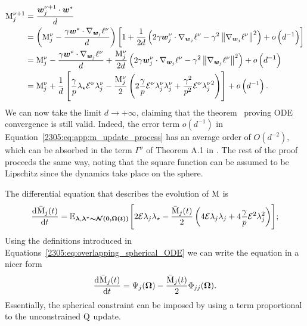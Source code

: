 \begin{equation}\label{2305:eq:app:m_update_process}
\begin{split}
  \mathrm{M}^{\nu+1}_{j} &= \frac{{\boldsymbol{w}}^{\nu+1}_j\cdot{\boldsymbol{w}}^*}{d} \\
    &= \left(\mathrm{M}^{\nu}_{j} - \frac{\gamma{\boldsymbol{w}}^*\cdot\nabla_{{\boldsymbol{w}}_j}{\ell^\nu}}{d}\right)\left[1+ \frac{1}{2d}\left(2\gamma{\boldsymbol{w}}^{\nu}_j\cdot \nabla_{{\boldsymbol{w}}_j}{\ell^\nu}-\gamma^2\left\|\nabla_{{\boldsymbol{w}}_j}{\ell^\nu}\right\|^2\right)+o\left(d^{-1}\right)\right]\\
    &= \mathrm{M}^{\nu}_{j} - \frac{\gamma{\boldsymbol{w}}^*\cdot\nabla_{{\boldsymbol{w}}_j}{\ell^\nu}}{d} + \frac{\mathrm{M}^{\nu}_{j}}{2d}\left(2\gamma{\boldsymbol{w}}^{\nu}_j\cdot \nabla_{{\boldsymbol{w}}_j}{\ell^\nu}-\gamma^2\left\|\nabla_{{\boldsymbol{w}}_j}{\ell^\nu}\right\|^2\right)+o\left(d^{-1}\right) \\
    &= \mathrm{M}^{\nu}_{j} +\frac{1}{d}\left[
      \frac{\gamma}{p} \lambda_\star\mathcal{E}^\nu\lambda^\nu_j -
      \frac{\mathrm{M}^{\nu}_{j}}{2}\left(2\frac{\gamma}{p}\mathcal{E}^\nu\lambda^\nu_j\lambda^\nu_j + \frac{\gamma^2}{p^2} {\mathcal{E}^\nu\lambda^\nu_j}^2\right)
    \right] + o\left(d^{-1}\right).
\end{split}
\end{equation}
We can now take the limit \(d\to+\infty\), claiming that the theorem~\cite{veiga2022phase,goldt2019dynamics} proving ODE convergence is still valid. Indeed, the error term $o(d^{-1})$ in Equation~\eqref{2305:eq:app:m_update_process} has an average order of $O(d^{-2})$, which can be absorbed in the term $\Gamma^\nu$ of Theorem A.1 in \cite{veiga2022phase}. The rest of the proof proceeds the same way, noting that the square function can be assumed to be Lipschitz since the dynamics take place on the sphere.

The differential equation that describes the evolution of \(\mathrm{M}\) is
\[
  \dod{\bar\M_j{\left(t\right)}}{t} =\mathbb E_{\vec{\lf},\vec{\lf^* \sim \gauss{(0,\vec{\Omega}{(t)})}}}{\left[ 2\dsp\lf_j \lf_\star - \frac{\bar\M_j{\left(t\right)}}{2}\left(4\dsp\lf_j\lf_j + 4\frac{\gamma}{p} {\dsp}^2\lf_j^2\right)\right]};
\]
Using the definitions introduced in Equations~\eqref{2305:eq:overlapping_spherical_ODE} we can write the equation in a nicer form
\begin{equation} \label{2305:eq:genericsphericalM}
  \dod{\bar\M_j{\left(t\right)}}{t} = \Psi_{j}{(\vec{\Omega})} - \frac{\bar\M_j{\left(t\right)}}{2}\Phi_{jj}{(\vec{\Omega})}.
\end{equation}
Essentially, the spherical constraint can be imposed by using a term proportional to the unconstrained \(\mathrm{Q}\) update.

